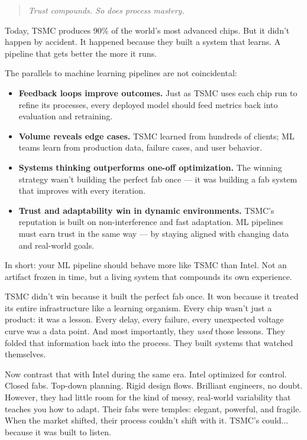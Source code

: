 \begin{quote}
\textit{Trust compounds. So does process mastery.}
\end{quote}

Today, TSMC produces 90\% of the world’s most advanced chips. But it didn’t happen by accident. It happened because they built a system that learns. A pipeline that gets better the more it runs.

The parallels to machine learning pipelines are not coincidental:

\begin{itemize}
    \item \textbf{Feedback loops improve outcomes.} Just as TSMC uses each chip run to refine its processes, every deployed model should feed metrics back into evaluation and retraining.
    \item \textbf{Volume reveals edge cases.} TSMC learned from hundreds of clients; ML teams learn from production data, failure cases, and user behavior.
    \item \textbf{Systems thinking outperforms one-off optimization.} The winning strategy wasn’t building the perfect fab once — it was building a fab system that improves with every iteration.
    \item \textbf{Trust and adaptability win in dynamic environments.} TSMC’s reputation is built on non-interference and fast adaptation. ML pipelines must earn trust in the same way — by staying aligned with changing data and real-world goals.
\end{itemize}

In short: your ML pipeline should behave more like TSMC than Intel. Not an artifact frozen in time, but a living system that compounds its own experience.

TSMC didn’t win because it built the perfect fab once. It won because it treated its entire infrastructure like a learning organism. Every chip wasn’t just a product: it was a lesson. Every delay, every failure, every unexpected voltage curve was a data point. And most importantly, they \textit{used} those lessons. They folded that information back into the process. They built systems that watched themselves.

Now contrast that with Intel during the same era. Intel optimized for control. Closed fabs. Top-down planning. Rigid design flows. Brilliant engineers, no doubt. However, they had little room for the kind of messy, real-world variability that teaches you how to adapt. Their fabs were temples: elegant, powerful, and fragile. When the market shifted, their process couldn’t shift with it. TSMC’s could... because it was built to listen.

